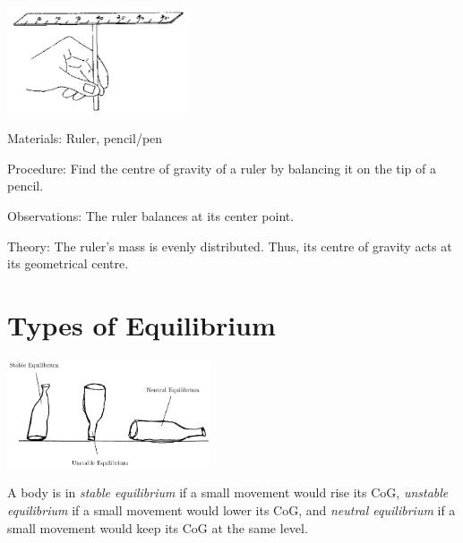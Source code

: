 \begin{multicols}{2}
\begin{center}
\includegraphics[width=0.4\textwidth]{./img/source/cog-ruler.png}
\end{center}

\begin{description*}
\item[Materials:]{Ruler, pencil/pen}
\item[Procedure:]{Find the centre of gravity of a ruler by balancing it on the tip of a pencil.}
\item[Observations:]{The ruler balances at its center point.}
\item[Theory:]{The ruler's mass is evenly distributed. Thus, its centre of gravity acts at its geometrical centre.}
\end{description*}


\section*{Types of Equilibrium}

\begin{center}
\includegraphics[width=0.45\textwidth]{./img/equilibrium.png}
\end{center}

A body is in \emph{stable equilibrium} if a small movement would rise its CoG, \emph{unstable equilibrium} if a small movement would lower its CoG, and \emph{neutral equilibrium} if a small movement would keep its CoG at the same level.


\end{multicols}
